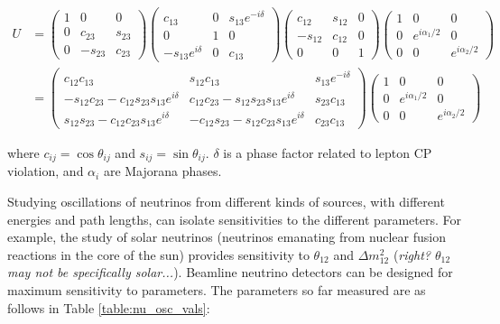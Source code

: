 \begin{equation}
\begin{aligned}
U &= \begin{pmatrix}
1 & 0 & 0 \\
0 & c_{23} & s_{23} \\
0 & -s_{23} & c_{23} \end{pmatrix}
\begin{pmatrix}
c_{13} & 0 & s_{13} e^{-i \delta} \\
0 & 1 & 0 \\
-s_{13} e^{i \delta} & 0 & c_{13} \end{pmatrix}
\begin{pmatrix}
c_{12} & s_{12} & 0 \\
-s_{12} & c_{12} & 0 \\
0 & 0 & 1 \end{pmatrix}
\begin{pmatrix}
1 & 0 & 0 \\
0 & e^{i \alpha_{1}/2} & 0 \\
0 & 0 & e^{i \alpha_{2}/2} \end{pmatrix} \\
& = \begin{pmatrix}
c_{12} c_{13} & s_{12} c_{13} & s_{13} e^{-i \delta} \\
-s_{12} c_{23} - c_{12} s_{23} s_{13} e^{i \delta} & c_{12} c_{23} - s_{12} s_{23} s_{13} e^{i \delta} & s_{23} c_{13} \\
s_{12} s_{23} - c_{12} c_{23} s_{13} e^{i \delta} & -c_{12} s_{23} - s_{12} c_{23} s_{13} e^{i \delta} & c_{23} c_{13} \end{pmatrix}
\begin{pmatrix}
1 & 0 & 0 \\
0 & e^{i \alpha_{1}/2} & 0 \\
0 & 0 & e^{i \alpha_{2}/2} \end{pmatrix}
\end{aligned}
\label{eqn:umatrix}
\end{equation}

\noindent
where $c_{ij} = \cos \theta_{ij}$ and $s_{ij} = \sin \theta_{ij}$.  $\delta$ is a phase factor related to lepton CP violation, and $\alpha_{i}$ are Majorana phases.

Studying oscillations of neutrinos from different kinds of sources, with different energies and path lengths, can isolate sensitivities to the different parameters.  For example, the study of solar neutrinos (neutrinos emanating from nuclear fusion reactions in the core of the sun) provides sensitivity to $\theta_{12}$ and $\Delta m_{12}^{2}$ {\color{gray}(\emph{right? $\theta_{12}$ may not be specifically solar...})}.  Beamline neutrino detectors can be designed for maximum sensitivity to parameters.  The parameters so far measured are as follows in Table  \ref{table:nu_osc_vals}:

